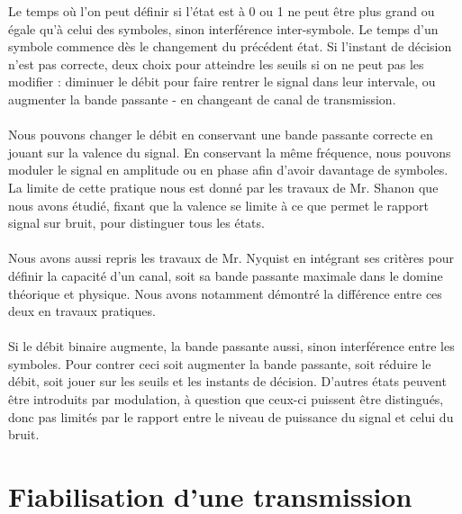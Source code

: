 Le temps où l'on peut définir si l'état est à 0 ou 1 ne peut être plus grand ou égale qu'à celui des symboles, sinon interférence inter-symbole. Le temps d'un symbole commence dès le changement du précédent état. Si l'instant de décision n'est pas correcte, deux choix pour atteindre les seuils si on ne peut pas les modifier : diminuer le débit pour faire rentrer le signal dans leur intervale, ou augmenter la bande passante - en changeant de canal de transmission.
\\ \\
Nous pouvons changer le débit en conservant une bande passante correcte en jouant sur la valence du signal. En conservant la même fréquence, nous pouvons moduler le signal en amplitude ou en phase afin d'avoir davantage de symboles. La limite de cette pratique nous est donné par les travaux de Mr. Shanon que nous avons étudié, fixant que la valence se limite à ce que permet le rapport signal sur bruit, pour distinguer tous les états.
\\ \\
Nous avons aussi repris les travaux de Mr. Nyquist en intégrant ses critères pour définir la capacité d'un canal, soit sa bande passante maximale dans le domine théorique et physique. Nous avons notamment démontré la différence entre ces deux en travaux pratiques.
\\ \\
Si le débit binaire augmente, la bande passante aussi, sinon interférence entre les symboles. Pour contrer ceci soit augmenter la bande passante, soit réduire le débit, soit jouer sur les seuils et les instants de décision. D'autres états peuvent être introduits par modulation, à question que ceux-ci puissent être distingués, donc pas limités par le rapport entre le niveau de puissance du signal et celui du bruit.

\section{Fiabilisation d'une transmission}

